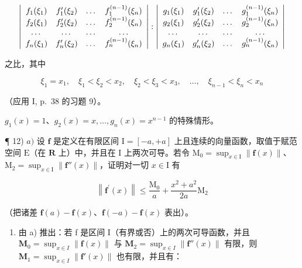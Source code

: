 \[
\left| \begin{array}{c c c c} f _ {1} (\xi_ {1}) & f _ {1} ^ {\prime} (\xi_ {2}) & \dots & f _ {1} ^ {(n - 1)} (\xi_ {n}) \\ f _ {2} (\xi_ {1}) & f _ {2} ^ {\prime} (\xi_ {2}) & \dots & f _ {2} ^ {(n - 1)} (\xi_ {n}) \\ \dots & \dots & \dots & \dots \\ f _ {n} (\xi_ {1}) & f _ {n} ^ {\prime} (\xi_ {2}) & \dots & f _ {n} ^ {(n - 1)} (\xi_ {n}) \end{array} \right|: \left| \begin{array}{c c c c} g _ {1} (\xi_ {1}) & g _ {1} ^ {\prime} (\xi_ {2}) & \dots & g _ {1} ^ {(n - 1)} (\xi_ {n}) \\ g _ {2} (\xi_ {1}) & g _ {2} ^ {\prime} (\xi_ {2}) & \dots & g _ {2} ^ {(n - 1)} (\xi_ {n}) \\ \dots & \dots & \dots & \dots \\ g _ {n} (\xi_ {1}) & g _ {n} ^ {\prime} (\xi_ {2}) & \dots & g _ {n} ^ {(n - 1)} (\xi_ {n}) \end{array} \right|
\]

之比，其中

\[
\xi_ {1} = x _ {1}, \quad \xi_ {1} <   \xi_ {2} <   x _ {2}, \quad \xi_ {2} <   \xi_ {3} <   x _ {3}, \quad \dots , \quad \xi_ {n - 1} <   \xi_ {n} <   x _ {n}
\]

（应用 I, p.~38 的习题 9）。

\(g_{1}(x)=1\)、\(g_{2}(x)=x,\ldots,g_{n}(x)=x^{n-1}\) 的特殊情形。

¶ 12) \(a)\) 设 \(\mathbf{f}\) 是定义在有限区间 \(\mathrm{I} = [-a, + a]\) 上且连续的向量函数，取值于赋范空间 \(\mathrm{E}\)（在 \(\mathbf{R}\) 上）中，并且在 \(\mathrm{I}\) 上两次可导。若令 \(\mathrm{M}_0 = \sup_{x\in \mathrm{I}}\| \mathbf{f}(x)\|\)、\(\mathrm{M}_2 = \sup_{x\in \mathrm{I}}\| \mathbf{f}''(x)\|\)，证明对一切 \(x\in \mathrm{I}\) 有

\[
\left\| \mathbf {f} ^ {\prime} (x) \right\| \leqslant \frac {\mathrm{M} _ {0}}{a} + \frac {x ^ {2} + a ^ {2}}{2 a} \mathrm{M} _ {2}
\]

（把诸差 \(\mathbf{f}(a) - \mathbf{f}(x)\)、\(\mathbf{f}(-a) - \mathbf{f}(x)\) 表出）。

\begin{enumerate}
\def\labelenumi{\alph{enumi})}
\setcounter{enumi}{1}
\tightlist
\item
  由 a) 推出：若 f 是区间 I（有界或否）上的两次可导函数，并且 \(\mathbf{M}_{0} = \sup_{x \in I} \| \mathbf{f}(x) \|\) 与 \(\mathbf{M}_{2} = \sup_{x \in I} \| \mathbf{f}''(x) \|\) 有限，则 \(\mathbf{M}_{1} = \sup_{x \in I} \| \mathbf{f}'(x) \|\) 也有限，并且有：
\end{enumerate}

